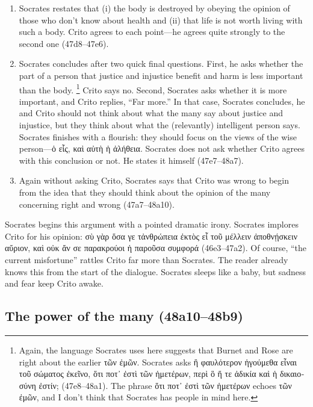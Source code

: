 \documentclass[12pt,letterpaper]{article}
\begin{document}
\begin{enumerate}
    \item Socrates restates that (i) the body is destroyed by obeying the opinion of those who don't know about health and (ii) that life is not worth living with such a body.
        Crito agrees to each point---he agrees quite strongly to the second one (47d8--47e6).

    \item Socrates concludes after two quick final questions.
        First, he asks whether the part of a person that justice and injustice benefit and harm is less important than the body.%
        \footnote{Again, the language Socrates uses here suggests that Burnet and Rose are right about the earlier \textgreek{τῶν ἐμῶν}.
        Socrates asks \textgreek{ἢ φαυλότερον ἡγούμεθα εἶναι τοῦ σώματος ἐκεῖνο, ὅτι ποτ᾽ ἐστὶ τῶν ἡμετέρων, περὶ ὃ ἥ τε ἀδικία καὶ ἡ δικαιοσύνη ἐστίν;} (47e8--48a1).
        The phrase \textgreek{ὅτι ποτ᾽ ἐστὶ τῶν ἡμετέρων} echoes \textgreek{τῶν ἐμῶν}, and I don't think that Socrates has people in mind here.}
        Crito says no.
        Second, Socrates asks whether it is more important, and Crito replies, ``Far more.''
        In that case, Socrates concludes, he and Crito should not think about what the many say about justice and injustice, but they think about what the (relevantly) intelligent person says.
        Socrates finishes with a flourish: they should focus on the views of the wise person---\textgreek{ὁ εἷς, καὶ αὐτὴ ἡ ἀλήθεια}.
        Socrates does not ask whether Crito agrees with this conclusion or not.
        He states it himself (47e7--48a7).

    \item Again without asking Crito, Socrates says that Crito was wrong to begin from the idea that they should think about the opinion of the many concerning right and wrong (47a7--48a10).

\end{enumerate}

Socrates begins this argument with a pointed dramatic irony.
Socrates implores Crito for his opinion: \textgreek{σὺ γὰρ ὅσα γε τἀνθρώπεια ἐκτὸς εἶ τοῦ μέλλειν ἀποθνῄσκειν αὔριον, καὶ οὐκ ἄν σε παρακρούοι ἡ παροῦσα συμφορά} (46e3--47a2).
Of course, ``the current misfortune'' rattles Crito far more than Socrates.
The reader already knows this from the start of the dialogue.
Socrates sleeps like a baby, but sadness and fear keep Crito awake.

\subsection*{The power of the many (48a10--48b9)}
\end{document}
